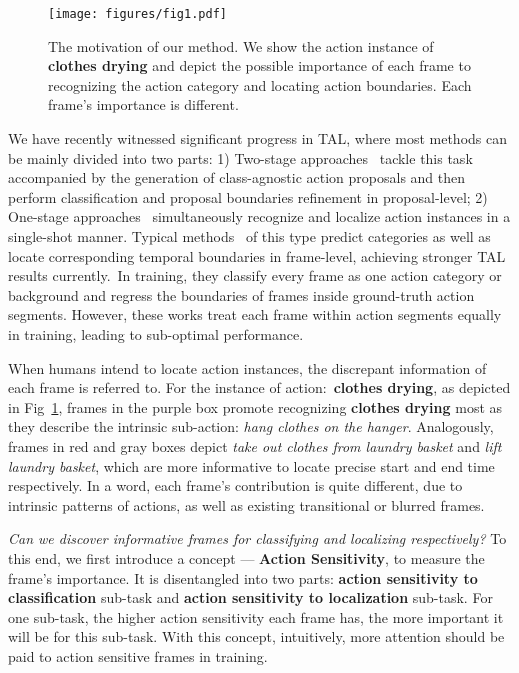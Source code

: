 \documentclass[10pt,twocolumn,letterpaper]{article}
\begin{document}
\begin{figure}[t]
\centering
\texttt{[image: figures/fig1.pdf]}
\caption{The motivation of our method. We show the action instance of \textbf{clothes drying} and depict the possible importance of each frame to recognizing the action category and locating action boundaries. Each frame's importance is different. }
\label{fig:intro}
\vspace{-1em}
\end{figure}

\par We have recently witnessed significant progress in TAL, where most methods can be mainly divided into two parts: 1) Two-stage approaches~\cite{PGCN2019ICCV, contextloc} tackle this task accompanied by the generation of class-agnostic action proposals and then perform classification and proposal boundaries refinement in proposal-level; 2) One-stage approaches~\cite{vsgn,xu2020gtad, ssd} simultaneously recognize and localize action instances in a single-shot manner. Typical methods~\cite{zhang2022actionformer,afsd} of this type predict categories as well as locate corresponding temporal boundaries in frame-level, achieving stronger TAL results currently.~In training, they classify every frame as one action category or background and regress the boundaries of frames inside ground-truth action segments. However, these works treat each frame within action segments equally in training, leading to sub-optimal performance.
\label{sec:intro}
\par  When humans intend to locate action instances, the discrepant information of each frame is referred to.  For the instance of action:~\textbf{clothes drying}, as depicted in Fig~\ref{fig:intro},  frames in the purple box promote recognizing \textbf{clothes drying} most as they describe the intrinsic sub-action: \textit{hang clothes on the hanger}. Analogously, frames in red and gray boxes depict \textit{take out clothes from laundry basket} and \textit{lift laundry basket}, which are more informative to locate precise start and end time respectively.
In a word, each frame's contribution is quite different,  due to intrinsic patterns of actions, as well as existing transitional or blurred frames.
\par \textit{Can we discover informative frames for classifying and localizing respectively?} To this end, we first introduce a concept --- \textbf{Action Sensitivity}, to measure the frame's importance. It is disentangled into two parts: \textbf{action sensitivity to classification} sub-task and \textbf{action sensitivity to localization} sub-task. For one sub-task, the higher action sensitivity each frame has, the more important it will be for this sub-task. With this concept, intuitively, more attention should be paid to action sensitive frames in training.
\end{document}
